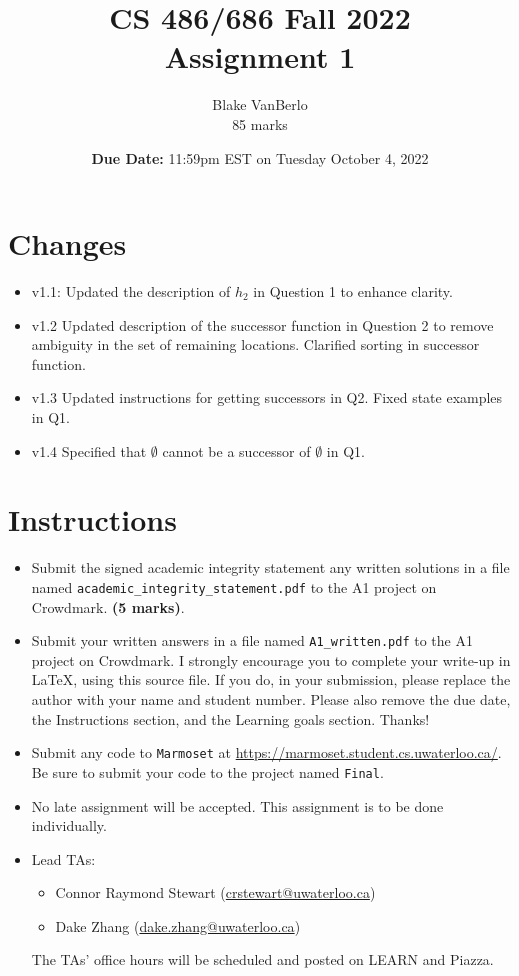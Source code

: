 \documentclass[12pt]{article}
\title{CS 486/686 Fall 2022 \\ Assignment 1 \\
}
\author{Blake VanBerlo \\ 85 marks}
\date{{\bf Due Date:} 11:59pm EST on Tuesday October 4, 2022}
\begin{document}
\maketitle

\section*{Changes}

\begin{itemize}
\item v1.1: Updated the description of $h_2$ in Question 1 to enhance clarity.
\item v1.2 Updated description of the successor function in Question 2 to remove ambiguity in the set of remaining locations. Clarified sorting in successor function.
\item v1.3 Updated instructions for getting successors in Q2. Fixed state examples in Q1.
\item v1.4 Specified that $\emptyset$ cannot be a successor of $\emptyset$ in Q1.
\end{itemize}


\newpage
\section*{Instructions}

\begin{itemize}
\item
Submit the signed academic integrity statement any written solutions in a file named \verb+academic_integrity_statement.pdf+ to the A1 project on Crowdmark. \textbf{(5 marks)}.

\item Submit your written answers in a file named \verb+A1_written.pdf+ to the A1 project on Crowdmark. I strongly encourage you to complete your write-up in LaTeX, using this source file. If you do, in your submission, please replace the author with your name and student number. Please also remove the due date, the Instructions section, and the Learning goals section. Thanks!

\item Submit any code to \verb+Marmoset+ at \url{https://marmoset.student.cs.uwaterloo.ca/}. Be sure to submit your code to the project named \texttt{Final}. 

\item
No late assignment will be accepted. This assignment is to be done individually.


\item
Lead TAs: 
\begin{itemize}
\item 
Connor Raymond Stewart (\url{crstewart@uwaterloo.ca})
\item
Dake Zhang (\url{dake.zhang@uwaterloo.ca})
\end{itemize}
The TAs' office hours will be scheduled and posted on LEARN and Piazza.
\end{itemize}
\end{document}
